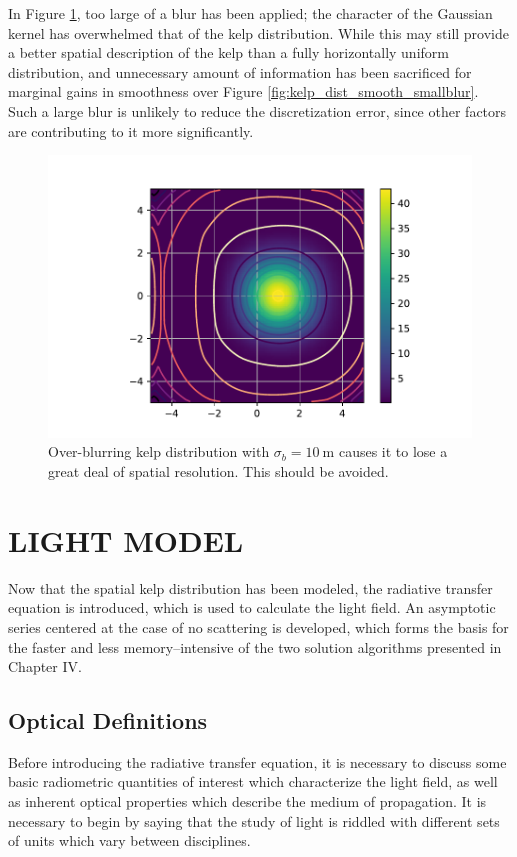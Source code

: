 \documentclass[ms,cpyr,lof,lot]{uathesis}
\begin{document}
In Figure \ref{fig:kelp_dist_smooth_blur}, too large of a blur has been applied; the character of the Gaussian kernel has overwhelmed that of the kelp distribution.
While this may still provide a better spatial description of the kelp than a fully horizontally uniform distribution, and unnecessary amount of information has been sacrificed for marginal gains in smoothness over Figure \ref{fig:kelp_dist_smooth_smallblur}.
Such a large blur is unlikely to reduce the discretization error, since other factors are contributing to it more significantly.
\begin{figure}[H]
  \centering
  \vspace{-3em}
  \includegraphics[width=5in]{kelp_dist_smooth_blur}
  \caption{Over-blurring kelp distribution with $\sigma_b=\SI{10}{\m}$ causes it to lose a great deal of spatial resolution. This should be avoided.}
  \label{fig:kelp_dist_smooth_blur}
\end{figure}

\chapter{LIGHT MODEL}
\label{chap:light}

Now that the spatial kelp distribution has been modeled, the radiative transfer equation is introduced, which is used to calculate the light field.
An asymptotic series centered at the case of no scattering is developed, which forms the basis for the faster and less memory--intensive of the two solution algorithms presented in Chapter IV.

\section{Optical Definitions}
Before introducing the radiative transfer equation, it is necessary to discuss some basic radiometric quantities of interest which characterize the light field, as well as inherent optical properties which describe the medium of propagation.
It is necessary to begin by saying that the study of light is riddled with different sets of units which vary between disciplines.
\end{document}
